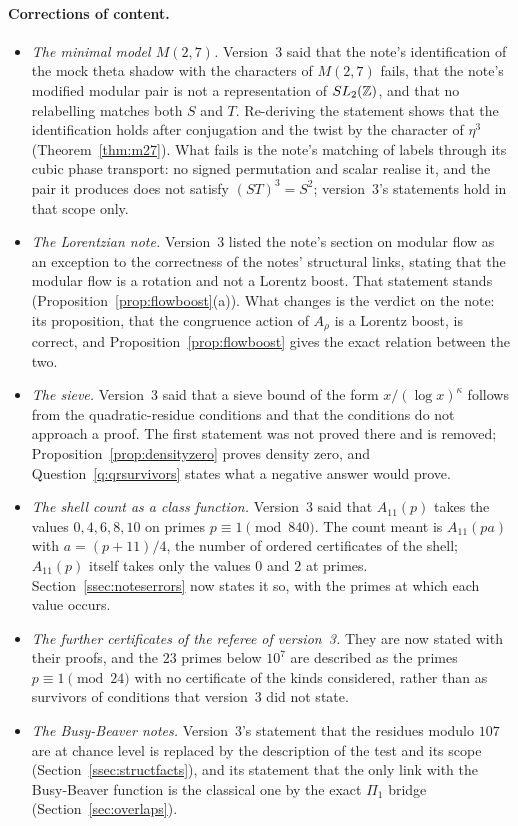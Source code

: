 \paragraph{Corrections of content.}
\begin{itemize}
\item \emph{The minimal model $M(2,7)$.} Version~3 said that the note's identification of the mock theta shadow with the characters of $M(2,7)$ fails, that the note's modified modular pair is not a representation of $SL_2(\mathbb{Z})$, and that no relabelling matches both $S$ and $T$. Re-deriving the statement shows that the identification holds after conjugation and the twist by the character of $\eta^3$ (Theorem~\ref{thm:m27}). What fails is the note's matching of labels through its cubic phase transport: no signed permutation and scalar realise it, and the pair it produces does not satisfy $(ST)^3=S^2$; version~3's statements hold in that scope only.
\item \emph{The Lorentzian note.} Version~3 listed the note's section on modular flow as an exception to the correctness of the notes' structural links, stating that the modular flow is a rotation and not a Lorentz boost. That statement stands (Proposition~\ref{prop:flowboost}(a)). What changes is the verdict on the note: its proposition, that the congruence action of $A_\rho$ is a Lorentz boost, is correct, and Proposition~\ref{prop:flowboost} gives the exact relation between the two.
\item \emph{The sieve.} Version~3 said that a sieve bound of the form $x/(\log x)^\kappa$ follows from the quadratic-residue conditions and that the conditions do not approach a proof. The first statement was not proved there and is removed; Proposition~\ref{prop:densityzero} proves density zero, and Question~\ref{q:qrsurvivors} states what a negative answer would prove.
\item \emph{The shell count as a class function.} Version~3 said that $A_{11}(p)$ takes the values $0,4,6,8,10$ on primes $p\equiv1\pmod{840}$. The count meant is $A_{11}(pa)$ with $a=(p+11)/4$, the number of ordered certificates of the shell; $A_{11}(p)$ itself takes only the values $0$ and $2$ at primes. Section~\ref{ssec:noteserrors} now states it so, with the primes at which each value occurs.
\item \emph{The further certificates of the referee of version~3.} They are now stated with their proofs, and the $23$ primes below $10^7$ are described as the primes $p\equiv1\pmod{24}$ with no certificate of the kinds considered, rather than as survivors of conditions that version~3 did not state.
\item \emph{The Busy-Beaver notes.} Version~3's statement that the residues modulo $107$ are at chance level is replaced by the description of the test and its scope (Section~\ref{ssec:structfacts}), and its statement that the only link with the Busy-Beaver function is the classical one by the exact $\Pi_1$ bridge (Section~\ref{sec:overlaps}).
\end{itemize}

